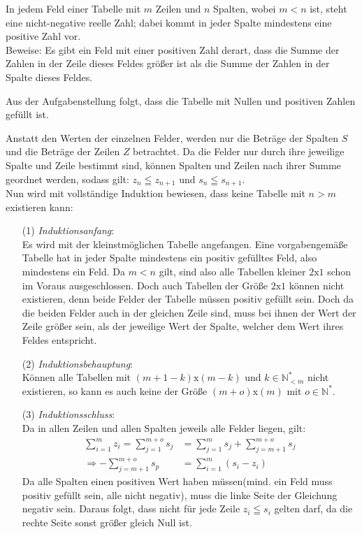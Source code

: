 \documentclass[10pt, a4paper]{amsart}
\makeatletter
\renewenvironment{proof}[1][\proofname]{\par
\pushQED{\qed}%
\normalfont \topsep6\p@\@plus6\p@\relax
\trivlist
\item\relax
{\bfseries#1}\hspace\labelsep\ignorespaces
}{%
\popQED\endtrivlist\@endpefalse
}
\makeatother
\begin{document}
\newpage
\begin{aufgabe}
  In jedem Feld einer Tabelle mit $m$ Zeilen und $n$ Spalten, wobei $m < n$ ist,
  steht eine nicht-negative reelle Zahl; dabei kommt in jeder Spalte mindestens
  eine positive Zahl vor.\\
  Beweise: Es gibt ein Feld mit einer positiven Zahl
  derart, dass die Summe der Zahlen in der Zeile dieses Feldes größer ist als
  die Summe der Zahlen in der Spalte dieses Feldes.\\
\end{aufgabe}
\begin{proof}
  Aus der Aufgabenstellung folgt, dass die Tabelle mit Nullen und positiven
  Zahlen gefüllt ist.

  Anstatt den Werten der einzelnen Felder, werden nur die Beträge der Spalten
  $S$ und die Beträge der Zeilen $Z$ betrachtet. Da die Felder nur durch ihre
  jeweilige Spalte und Zeile bestimmt sind, können Spalten und Zeilen nach ihrer
  Summe geordnet werden, sodass gilt: $z_n\leqq z_{n+1}$ und $s_n\leqq s_{n+1}$.\\
  Nun wird mit vollständige Induktion bewiesen, dass keine Tabelle mit $n > m$
  existieren kann:\\
  \begin{itemize}[itemsep=2ex]
  \item[(1)]\emph{Induktionsanfang}:\\
    Es wird mit der kleinstmöglichen Tabelle angefangen. Eine vorgabengemäße
    Tabelle hat in jeder Spalte mindestens ein positiv gefülltes Feld, also
    mindestens ein Feld. Da $m<n$ gilt, sind also alle Tabellen kleiner
    $2\text{x}1$ schon im Voraus ausgeschlossen. Doch auch Tabellen der Größe
    $2\text{x}1$ können nicht existieren, denn beide Felder der Tabelle müssen
    positiv gefüllt sein. Doch da die beiden Felder auch in der gleichen Zeile
    sind, muss bei ihnen der Wert der Zeile größer sein, als der jeweilige Wert
    der Spalte, welcher dem Wert ihres Feldes entspricht.
  \item[(2)]\emph{Induktionsbehauptung}:\\
    Können alle Tabellen mit $(m+1-k)\text{x}(m-k)$ und $k∈ℕ^*_{<m}$ nicht
    existieren, so kann es auch keine der Größe $(m+o)\text{x}(m)$ mit $o∈ℕ^*$.
  \item[(3)]\emph{Induktionsschluss}:\\
    Da in allen Zeilen und allen Spalten jeweils alle Felder liegen, gilt:
    \begin{align*}
      \sum_{i=1}^{m}z_i=\sum_{j=1}^{m+o}s_j&=\sum_{j=1}^{m}s_j+\sum_{j=m+1}^{m+o}s_j\\
      \Rightarrow -\sum_{j=m+1}^{m+o}s_p&= \sum_{i=1}^{m}(s_i-z_i)
    \end{align*}
    Da alle Spalten einen positiven Wert haben müssen(mind. ein Feld muss
    positiv gefüllt sein, alle nicht negativ), muss die linke Seite der
    Gleichung negativ sein. Daraus folgt, dass nicht für jede Zeile $z_i\leqq
    s_i$ gelten
    darf, da die rechte Seite sonst größer gleich Null ist.\\
    

\end{itemize}
\end{proof}
\end{document}
